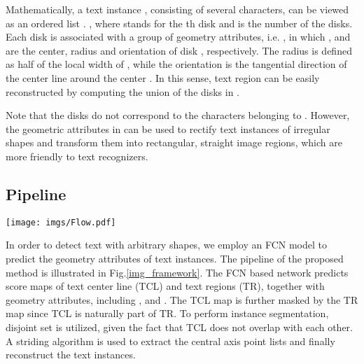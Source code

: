 \documentclass[runningheads]{llncs}
\begin{document}
Mathematically, a text instance , consisting of several characters, can be viewed as an ordered list . , where  stands for the th disk and  is the number of the disks. Each disk  is associated with a group of geometry attributes, i.e. , in which ,  and  are the center, radius and orientation of disk , respectively. The radius  is defined as half of the local width of , while the orientation  is the tangential direction of the center line around the center . In this sense, text region  can be easily reconstructed by computing the union of the disks in . 



Note that the disks do not correspond to the characters belonging to . However, the geometric attributes in  can be used to rectify text instances of irregular shapes and transform them into rectangular, straight image regions, which are more friendly to text recognizers. 

\subsection{Pipeline} \label{sec:pipeline}

\begin{figure*}
\vspace{-3mm}
\begin{centering}
\texttt{[image: imgs/Flow.pdf]}
\par\end{centering}
\vspace{-3mm}
\caption{Method framework: network output and post-processing}  \label{img_framework}
\vspace{-5mm}
\end{figure*}

In order to detect text with arbitrary shapes, we employ an FCN model to predict the geometry attributes of text instances. The pipeline of the proposed method is illustrated in Fig.\ref{img_framework}. The FCN based network predicts score maps of text center line (TCL) and  text regions (TR), together with geometry attributes, including ,  and . The TCL map is further masked by the TR map since TCL is naturally part of TR. To perform instance segmentation, disjoint set is utilized, given the fact that TCL does not overlap with each other. A striding algorithm is used to extract the central axis point lists and finally reconstruct the text instances.
\end{document}
